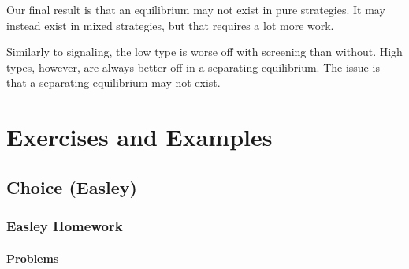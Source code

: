 \documentclass[12pt]{article}
\begin{document}
Our final result is that an equilibrium may not exist in pure strategies. It may instead exist in mixed strategies, but that requires a lot more work. 

Similarly to signaling, the low type is worse off with screening than without. High types, however, are always better off in a separating equilibrium. The issue is that a separating equilibrium may not exist.








































\newpage
\section{Exercises and Examples}\label{sec:exercises}

\subsection{Choice (Easley)}

\subsubsection{Easley Homework}

\paragraph{Problems}
\end{document}
